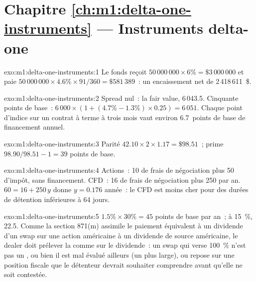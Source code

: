 \section*{Chapitre \ref{ch:m1:delta-one-instruments} --- Instruments delta-one}

\begin{solution}{exo:m1:delta-one-instruments:1}
Le fonds reçoit $50\,000\,000 \times 6\% = \$3\,000\,000$ et paie
$50\,000\,000 \times 4.6\% \times 91/360 = \$581\,389$~: un encaissement net de
2\,418\,611~\$.
\end{solution}

\begin{solution}{exo:m1:delta-one-instruments:2}
Spread nul~: la fair value, 6\,043.5. Cinquante points de base~: $6\,000 \times (1 +
(4.7\% - 1.3\%) \times 0.25) = 6\,051$. Chaque point d'indice sur un
contrat à terme à trois mois vaut environ 6.7~points de base de financement annuel.
\end{solution}

\begin{solution}{exo:m1:delta-one-instruments:3}
Parité $42.10 \times 2 \times 1.17 = \$98.51$~; prime $98.90/98.51 - 1 = 39$
points de base.
\end{solution}

\begin{solution}{exo:m1:delta-one-instruments:4}
Actions~: 10 de frais de négociation plus 50 d'impôt, sans financement. CFD~: 16 de frais de négociation plus 250
par an. $60 = 16 + 250\,y$ donne $y = 0.176$ année~: le CFD est moins cher pour
des durées de détention inférieures à 64 jours.
\end{solution}

\begin{solution}{exo:m1:delta-one-instruments:5}
$1.5\% \times 30\% = 45$ points de base par an~; à 15~\%, 22.5. Comme la section
871(m) assimile le paiement équivalent à un dividende d'un swap  sur une
action américaine à un dividende de source américaine, le dealer doit prélever la  comme sur le
dividende~: un swap qui verse 100~\% n'est pas un , ou bien il est mal
évalué ailleurs (un  plus large), ou repose sur une position fiscale que le détenteur
devrait souhaiter comprendre avant qu'elle ne soit contestée.
\end{solution}

